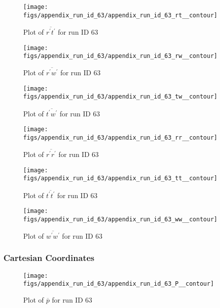 \begin{figure}[H]
\centering
\texttt{[image: figs/appendix\_run\_id\_63/appendix\_run\_id\_63\_rt\_\_contour]}
\caption{Plot of $\overline{r^\prime t^\prime}$ for run ID 63}
\label{fig:appendix_run_id_63_rt__contour}
\end{figure}


\begin{figure}[H]
\centering
\texttt{[image: figs/appendix\_run\_id\_63/appendix\_run\_id\_63\_rw\_\_contour]}
\caption{Plot of $\overline{r^\prime w^\prime}$ for run ID 63}
\label{fig:appendix_run_id_63_rw__contour}
\end{figure}


\begin{figure}[H]
\centering
\texttt{[image: figs/appendix\_run\_id\_63/appendix\_run\_id\_63\_tw\_\_contour]}
\caption{Plot of $\overline{t^\prime w^\prime}$ for run ID 63}
\label{fig:appendix_run_id_63_tw__contour}
\end{figure}


\begin{figure}[H]
\centering
\texttt{[image: figs/appendix\_run\_id\_63/appendix\_run\_id\_63\_rr\_\_contour]}
\caption{Plot of $\overline{r^\prime r^\prime}$ for run ID 63}
\label{fig:appendix_run_id_63_rr__contour}
\end{figure}


\begin{figure}[H]
\centering
\texttt{[image: figs/appendix\_run\_id\_63/appendix\_run\_id\_63\_tt\_\_contour]}
\caption{Plot of $\overline{t^\prime t^\prime}$ for run ID 63}
\label{fig:appendix_run_id_63_tt__contour}
\end{figure}


\begin{figure}[H]
\centering
\texttt{[image: figs/appendix\_run\_id\_63/appendix\_run\_id\_63\_ww\_\_contour]}
\caption{Plot of $\overline{w^\prime w^\prime}$ for run ID 63}
\label{fig:appendix_run_id_63_ww__contour}
\end{figure}


\subsubsection{Cartesian Coordinates}
\begin{figure}[H]
\centering
\texttt{[image: figs/appendix\_run\_id\_63/appendix\_run\_id\_63\_P\_\_contour]}
\caption{Plot of $\overline{p}$ for run ID 63}
\label{fig:appendix_run_id_63_P__contour}
\end{figure}


